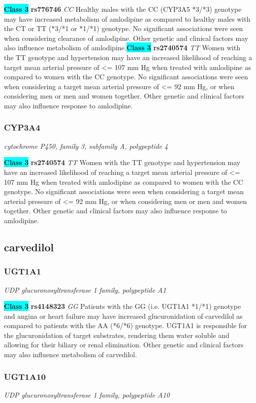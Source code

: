 \documentclass{report}
\begin{document}
\textbf{\colorbox{cyan} {Class 3}} \textbf{ rs776746 } \textit{ CC }
Healthy males with the CC (CYP3A5 *3/*3) genotype may have increased metabolism of amlodipine as compared to healthy males with the CT or TT (*3/*1 or *1/*1) genotype. No significant associations were seen when considering clearance of amlodipine. Other genetic and clinical factors may also influence metabolism of amlodipine.\newline\textbf{\colorbox{cyan} {Class 3}} \textbf{ rs2740574 } \textit{ TT }
Women with the TT genotype and hypertension may have an increased likelihood of reaching a target mean arterial pressure of <= 107 mm Hg when treated with amlodipine as compared to women with the CC genotype. No significant associations were seen when considering a target mean arterial pressure of <= 92 mm Hg, or when considering men or men and women together. Other genetic and clinical factors may also influence response to amlodipine.\newline\subsubsection{ CYP3A4 }
\textit{ cytochrome P450, family 3, subfamily A, polypeptide 4 }

\textbf{\colorbox{cyan} {Class 3}} \textbf{ rs2740574 } \textit{ TT }
Women with the TT genotype and hypertension may have an increased likelihood of reaching a target mean arterial pressure of <= 107 mm Hg when treated with amlodipine as compared to women with the CC genotype. No significant associations were seen when considering a target mean arterial pressure of <= 92 mm Hg, or when considering men or men and women together. Other genetic and clinical factors may also influence response to amlodipine.\newline\subsection{ carvedilol }\subsubsection{ UGT1A1 }
\textit{ UDP glucuronosyltransferase 1 family, polypeptide A1 }

\textbf{\colorbox{cyan} {Class 3}} \textbf{ rs4148323 } \textit{ GG }
Patients with the GG (i.e. UGT1A1 *1/*1) genotype and angina or heart failure may have increased glucuronidation of carvedilol as compared to patients with the AA (*6/*6) genotype. UGT1A1 is responsible for the glucuronidation of target substrates, rendering them water soluble and allowing for their biliary or renal elimination. Other genetic and clinical factors may also influence metabolism of carvedilol.\newline\subsubsection{ UGT1A10 }
\textit{ UDP glucuronosyltransferase 1 family, polypeptide A10 }
\end{document}
